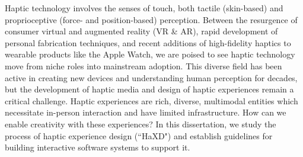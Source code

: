 Haptic technology involves the senses of touch, both tactile (skin-based) and proprioceptive (force- and position-based) perception.
Between the resurgence of consumer virtual and augmented reality (VR \& AR), rapid development of personal fabrication techniques, and recent additions of high-fidelity haptics to wearable products like the Apple Watch, we are poised to see haptic technology move from niche roles into mainstream adoption.
This diverse field has been active in creating new devices and understanding human perception for decades, but the development of haptic media and design of haptic experiences remain a critical challenge.
Haptic experiences are rich, diverse, multimodal entities which necessitate in-person interaction and have limited infrastructure.
How can we enable creativity with these experiences?
In this dissertation, we study the process of haptic experience design (``HaXD") and establish guidelines for building interactive software systems to support it.
%
%
%
